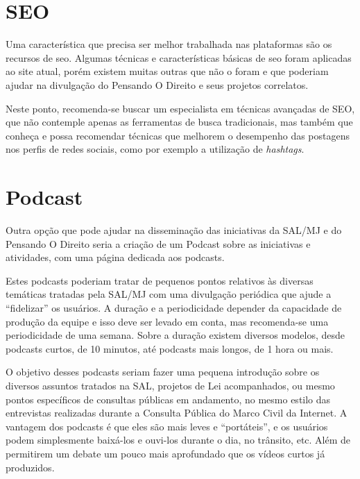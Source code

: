 \section{SEO}
Uma característica que precisa ser melhor trabalhada nas plataformas são os recursos de \gls{seo}. Algumas técnicas e características básicas de \gls{seo} foram aplicadas ao site atual, porém existem muitas outras que não o foram e que poderiam ajudar na divulgação do Pensando O Direito e seus projetos correlatos.

Neste ponto, recomenda-se buscar um especialista em técnicas avançadas de SEO, que não contemple apenas as ferramentas de busca tradicionais, mas também que conheça e possa recomendar técnicas que melhorem o desempenho das postagens nos perfis de redes sociais, como por exemplo a utilização de \textit{hashtags}.

\section{Podcast}
Outra opção que pode ajudar na disseminação das iniciativas da SAL/MJ e do Pensando O Direito seria a criação de um Podcast sobre as iniciativas e atividades, com uma página dedicada aos podcasts.

Estes podcasts poderiam tratar de pequenos pontos relativos às diversas temáticas tratadas pela SAL/MJ com uma divulgação periódica que ajude a ``fidelizar'' os usuários.
A duração e a periodicidade depender da capacidade de produção da equipe e isso deve ser levado em conta, mas recomenda-se uma periodicidade de uma semana. Sobre a duração existem diversos modelos, desde podcasts curtos, de 10 minutos, até podcasts mais longos, de 1 hora ou mais.

O objetivo desses podcasts seriam fazer uma pequena introdução sobre os diversos assuntos tratados na SAL, projetos de Lei acompanhados, ou mesmo pontos específicos de consultas públicas em andamento, no mesmo estilo das entrevistas realizadas durante a Consulta Pública do Marco Civil da Internet. A vantagem dos podcasts é que eles são mais leves e ``portáteis'', e os usuários podem simplesmente baixá-los e ouvi-los durante o dia, no trânsito, etc. Além de permitirem um debate um pouco mais aprofundado que os vídeos curtos já produzidos.

